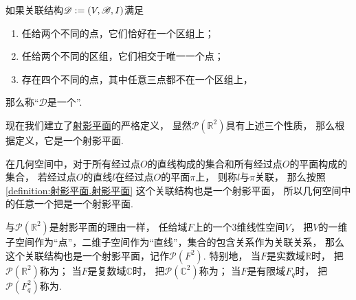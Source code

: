\begin{definition}\label{definition:射影平面.射影平面}
如果关联结构\(\mathscr{D} := (V,\mathscr{B},I)\)满足\begin{enumerate}
	\item 任给两个不同的点，它们恰好在一个区组上；
	\item 任给两个不同的区组，它们相交于唯一一个点；
	\item 存在四个不同的点，其中任意三点都不在一个区组上，
\end{enumerate}
那么称“\(\mathscr{D}\)是一个”.
\end{definition}

现在我们建立了\hyperref[definition:射影平面.射影平面]{射影平面}的严格定义，
显然\(\mathcal{P}(\mathbb{R}^2)\)具有上述三个性质，
那么根据定义，它是一个射影平面.

在几何空间中，对于所有经过点\(O\)的直线构成的集合和所有经过点\(O\)的平面构成的集合，
若经过点\(O\)的直线\(l\)在经过点\(O\)的平面\(\pi\)上，
则称\(l\)与\(\pi\)关联，
那么按照\cref{definition:射影平面.射影平面} 这个关联结构也是一个射影平面，
所以几何空间中的任意一个把是一个射影平面.

与\(\mathcal{P}(\mathbb{R}^2)\)是射影平面的理由一样，
任给域\(F\)上的一个3维线性空间\(V\)，
把\(V\)的一维子空间作为“点”，二维子空间作为“直线”，集合的包含关系作为关联关系，
那么这个关联结构也是一个射影平面，记作\(\mathcal{P}(F^2)\).
特别地，
当\(F\)是实数域\(\mathbb{R}\)时，
把\(\mathcal{P}(\mathbb{R}^2)\)称为；
当\(F\)是复数域\(\mathbb{C}\)时，
把\(\mathcal{P}(\mathbb{C}^2)\)称为；
当\(F\)是有限域\(F_q\)时，
把\(\mathcal{P}(F_q^2)\)称为.

